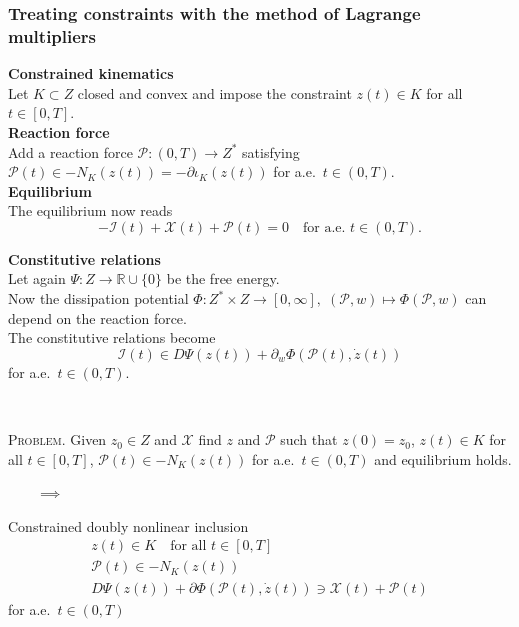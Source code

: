 \documentclass[8pt]{beamer}
\numberwithin{equation}{section}
\theoremstyle{definition}
\begin{document}
\begin{frame}
\frametitle{Treating constraints with the method of Lagrange multipliers}
\centering
\begin{minipage}[c]{0.47\textwidth}
\textbf{Constrained kinematics}
\\[0.5em]
Let $K\subset Z$ closed and convex and impose the constraint $z(t)\in K$ for all $t\in[0,T]$.
\\[1em]
\textbf{Reaction force}
\\[0.5em]
Add a reaction force $\mathcal{P}\colon(0,T)\to Z^*$ satisfying $\mathcal{P}(t)\in-N_K(z(t))=-\partial\iota_K(z(t))$ for a.e.\ $t\in(0,T)$.
\\[1em]
\textbf{Equilibrium}
\\[0.5em]
The equilibrium now reads
\[
-\mathcal{I}(t)+\mathcal{X}(t)+\mathcal{P}(t)=0\quad\text{for a.e.\ $t\in(0,T)$}.
\]
\end{minipage}
\hspace{0.02\textwidth}
\begin{minipage}[c]{0.47\textwidth}
\textbf{Constitutive relations}
\\[0.5em]
Let again $\Psi\colon Z\to\mathbb{R}\cup\{0\}$ be the free energy.
\\[0.5em]
Now the dissipation potential $\Phi\colon Z^*\times Z\to[0,\infty],\;(\mathcal{P},w)\mapsto\Phi(\mathcal{P},w)$ can depend on the reaction force.
\\[0.5em]
The constitutive relations become
\[
\mathcal{I}(t)\in D\Psi(z(t))+\partial_w\Phi(\mathcal{P}(t),\dot z(t))
\]
for a.e.\ $t\in(0,T)$.
\end{minipage}
\\[1em]
\begin{minipage}[c]{0.4\textwidth}
\textsc{Problem.} Given $z_0\in Z$ and $\mathcal{X}$ find $z$ and $\mathcal{P}$ such that $z(0)=z_0$, $z(t)\in K$ for all $t\in[0,T]$, $\mathcal{P}(t)\in-N_K(z(t))$ for a.e.\ $t\in(0,T)$ and equilibrium holds.
\end{minipage}
$\qquad\implies\qquad$
\begin{minipage}[c]{0.4\textwidth}
Constrained doubly nonlinear inclusion
\begin{gather*}
z(t)\in K\quad\text{for all $t\in[0,T]$} \\
\mathcal{P}(t)\in-N_K(z(t)) \\
D\Psi(z(t))+\partial\Phi(\mathcal{P}(t),\dot z(t))\ni\mathcal{X}(t)+\mathcal{P}(t)
\end{gather*}
for a.e.\ $t\in(0,T)$
\end{minipage}
\end{frame}
\end{document}
